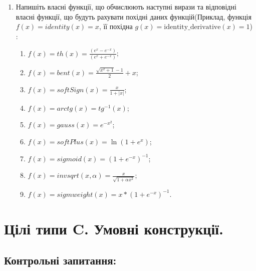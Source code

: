 \documentclass[a5paper,titlepage,openany,twoside,draft]{book_unv}%
\makeatletter
\newcommand{\xslalph}[1]{\expandafter\@xslalph\csname c@#1\endcsname}
\newcommand{\@xslalph}[1]{%
    \ifcase#1\or а\or б\or в\or г\or д\or e\or є\or ж\or з\or i%
    \or й\or к\or л\or м\or н\or о\or п\or р\or с\or т%
    \or у\or ф\or х\or ц\or ч\or ш\or ю\or я\or аа\or бб\or вв%
    \else\@ctrerr\fi%
}
\makeatother
\begin{document}
\begin{enumerate}
\item
  Напишіть власні функції, що обчислюють наступні вирази та відповідні
  власні функції, що будуть рахувати похідні даних функцій(Приклад,
  функція \(f(x) = identity(x) = x\), її похідна
  \(g(x) = \textrm{identity\_derivative}(x) = 1\)) :


  \begin{enumerate}[label=\xslalph*)]
  \item   \(f(x) = th(x) = \frac{(e^{x} - e^{-x})}{(e^{x} + e^{-x})}\);
\item \(f(x) = bent(x) = \frac{\sqrt{x^{2} + 1} - 1}{2} + x\);
\item \(f(x) = softSign(x) = \frac{x}{1 + |x|}\);
\item \(f(x) = arctg(x) = tg^{-1}(x)\);
\item\(f(x) = gauss(x) = e^{-x^{2}}\);
\item \(f(x) = softPlus(x) = \ln(1 + e^{x})\);
\item \(f(x) = sigmoid(x) = {(1 + e^{-x})}^{-1}\);
\item \(f(x) = invsqrt(x,\alpha) = \frac{x}{\sqrt{1 + \alpha x^{2}}}\);
\item\(f(x) = sigmweight(x) = x*{(1 + e^{-x})}^{-1}\).

 \end{enumerate}
\end{enumerate}


\chapter{ Цілі типи C. Умовні конструкції.}
%

\section{Контрольні запитання:}
\end{document}
